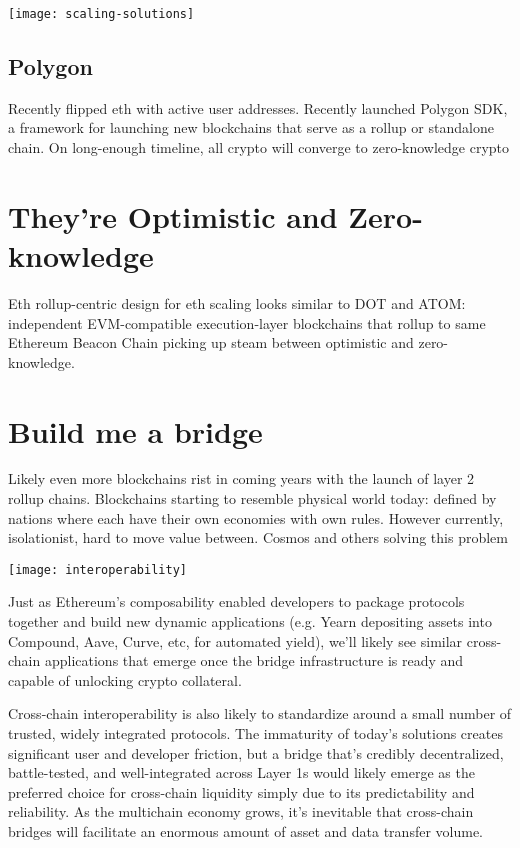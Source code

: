 \documentclass{../notes}
\begin{document}
\texttt{[image: scaling-solutions]}

\subsection{Polygon}
Recently flipped eth with active user addresses. Recently launched Polygon SDK, a framework for launching new blockchains that serve as a rollup or standalone chain. On long-enough timeline, all crypto will converge to zero-knowledge crypto

\section{They're Optimistic and Zero-knowledge}
Eth rollup-centric design for eth scaling looks similar to DOT and ATOM: independent EVM-compatible execution-layer blockchains that rollup to same Ethereum Beacon Chain picking up steam between optimistic and zero-knowledge. 

\section{Build me a bridge}
Likely even more blockchains rist in coming years with the launch of layer 2 rollup chains. Blockchains starting to resemble physical world today: defined by nations where each have their own economies with own rules. However currently, isolationist, hard to move value between. Cosmos and others solving this problem

\texttt{[image: interoperability]}

Just as Ethereum’s composability enabled developers to package protocols together and build new dynamic applications (e.g. Yearn depositing assets into Compound, Aave, Curve, etc, for automated yield), we’ll likely see similar cross-chain applications that emerge once the bridge infrastructure is ready and capable of unlocking crypto collateral.

Cross-chain interoperability is also likely to standardize around a small number of trusted, widely integrated protocols. The immaturity of today’s solutions creates significant user and developer friction, but a bridge that’s credibly decentralized, battle-tested, and well-integrated across Layer 1s would likely emerge as the preferred choice for cross-chain liquidity simply due to its predictability and reliability. As the multichain economy grows, it’s inevitable that cross-chain bridges will facilitate an enormous amount of asset and data transfer volume.
\end{document}
